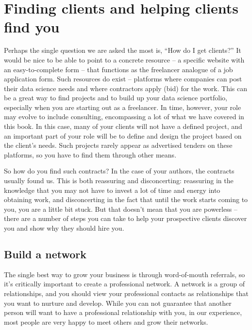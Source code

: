 \documentclass[
]{book}
\begin{document}
\hypertarget{finding-clients-and-helping-clients-find-you}{%
\section{Finding clients and helping clients find
you}\label{finding-clients-and-helping-clients-find-you}}

Perhaps the single question we are asked the most is, ``How do I get
clients?'' It would be nice to be able to point to a concrete resource
-- a specific website with an easy-to-complete form -- that functions as
the freelancer analogue of a job application form. Such resources do
exist -- platforms where companies can post their data science needs and
where contractors apply (bid) for the work. This can be a great way to
find projects and to build up your data science portfolio, especially
when you are starting out as a freelancer. In time, however, your role
may evolve to include consulting, encompassing a lot of what we have
covered in this book. In this case, many of your clients will not have a
defined project, and an important part of your role will be to define
and design the project based on the client's needs. Such projects rarely
appear as advertised tenders on these platforms, so you have to find
them through other means.

So how do you find such contracts? In the case of your authors, the
contracts usually found us. This is both reassuring and disconcerting:
reassuring in the knowledge that you may not have to invest a lot of
time and energy into obtaining work, and disconcerting in the fact that
until the work starts coming to you, you are a little bit stuck. But
that doesn't mean that you are powerless -- there are a number of steps
you can take to help your prospective clients discover you and show why
they should hire you.

\hypertarget{build-a-network}{%
\subsection{Build a network}\label{build-a-network}}

The single best way to grow your business is through word-of-mouth
referrals, so it's critically important to create a professional
network. A network is a group of relationships, and you should view your
professional contacts as relationships that you want to nurture and
develop. While you can not guarantee that another person will want to
have a professional relationship with you, in our experience, most
people are very happy to meet others and grow their networks.
\end{document}
